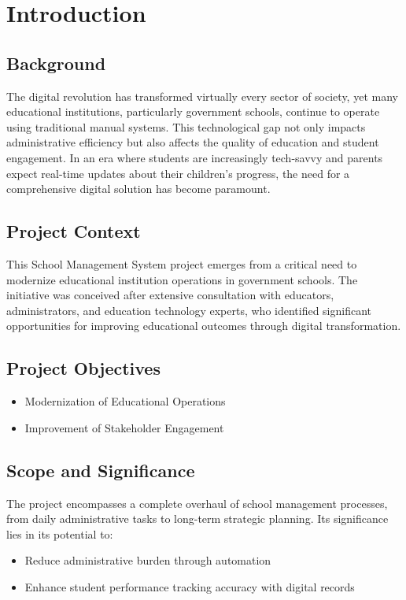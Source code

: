 \documentclass[12pt,a4paper]{report}
\begin{document}
\chapter{Introduction}
\section{Background}
The digital revolution has transformed virtually every sector of society, yet many educational institutions, particularly government schools, continue to operate using traditional manual systems. This technological gap not only impacts administrative efficiency but also affects the quality of education and student engagement. In an era where students are increasingly tech-savvy and parents expect real-time updates about their children's progress, the need for a comprehensive digital solution has become paramount.

\section{Project Context}
This School Management System project emerges from a critical need to modernize educational institution operations in government schools. The initiative was conceived after extensive consultation with educators, administrators, and education technology experts, who identified significant opportunities for improving educational outcomes through digital transformation.

\section{Project Objectives}
\begin{itemize}
    \item Modernization of Educational Operations
    \item Improvement of Stakeholder Engagement
\end{itemize}

\section{Scope and Significance}
The project encompasses a complete overhaul of school management processes, from daily administrative tasks to long-term strategic planning. Its significance lies in its potential to:
\begin{itemize}
    \item Reduce administrative burden through automation
    \item Enhance student performance tracking accuracy with digital records
\end{itemize}
\end{document}
